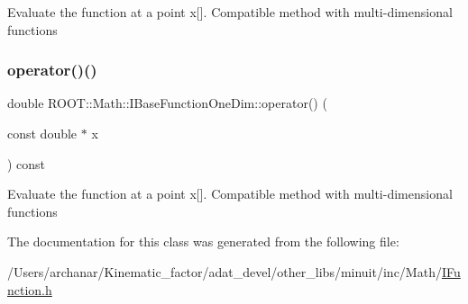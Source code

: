 Evaluate the function at a point x\mbox{[}\mbox{]}. Compatible method with multi-\/dimensional functions \mbox{\label{classROOT_1_1Math_1_1IBaseFunctionOneDim_ab99decfcf98d9b016322ebe85f4bc77a}} 
\subsubsection{\texorpdfstring{operator()()}{operator()()}\hspace{0.1cm}{\footnotesize\ttfamily [4/4]}}
{\footnotesize\ttfamily double R\+O\+O\+T\+::\+Math\+::\+I\+Base\+Function\+One\+Dim\+::operator() (\begin{DoxyParamCaption}\item[{const double $\ast$}]{x }\end{DoxyParamCaption}) const\hspace{0.3cm}{\ttfamily [inline]}}

Evaluate the function at a point x\mbox{[}\mbox{]}. Compatible method with multi-\/dimensional functions 

The documentation for this class was generated from the following file\+:\begin{DoxyCompactItemize}
\item 
/\+Users/archanar/\+Kinematic\+\_\+factor/adat\+\_\+devel/other\+\_\+libs/minuit/inc/\+Math/\mbox{\hyperlink{other__libs_2minuit_2inc_2Math_2IFunction_8h}{I\+Function.\+h}}\end{DoxyCompactItemize}
